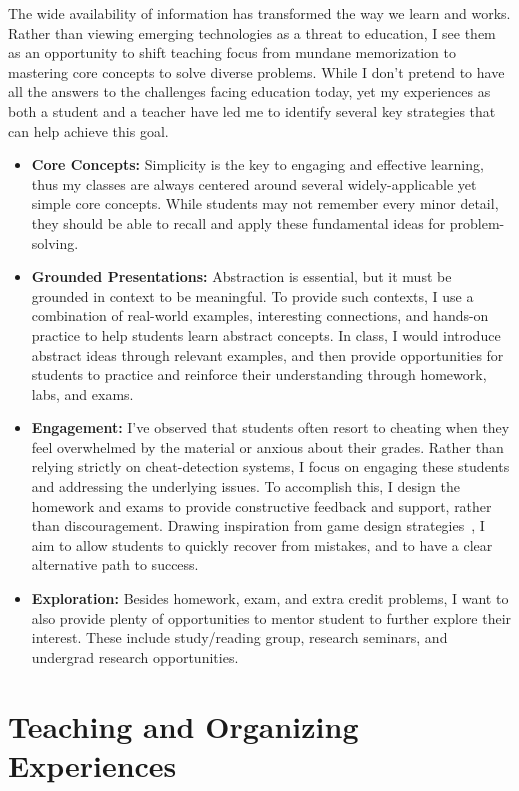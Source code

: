 \documentclass[11pt,a4paper,sans]{moderncv} %
\begin{document}
The wide availability of information has transformed the way we learn and works. 
Rather than viewing emerging technologies as a threat to education, I see them as an opportunity to shift teaching focus from mundane memorization to mastering core concepts to solve diverse problems.
While I don't pretend to have all the answers to the challenges facing education today, yet my experiences as both a student and a teacher have led me to identify several key strategies that can help achieve this goal.
\begin{itemize}
  \item \textbf{Core Concepts:}
  Simplicity is the key to engaging and effective learning, thus my classes are always centered around several widely-applicable yet simple core concepts. 
  While students may not remember every minor detail, they should be able to recall and apply these fundamental ideas for problem-solving.
  \item \textbf{Grounded Presentations:} 
  Abstraction is essential, but it must be grounded in context to be meaningful. 
  To provide such contexts, I use a combination of real-world examples, interesting connections, and hands-on practice to help students learn abstract concepts. 
  In class, I would introduce abstract ideas through relevant examples, and then provide opportunities for students to practice and reinforce their understanding through homework, labs, and exams.
  \item \textbf{Engagement:}
  I've observed that students often resort to cheating when they feel overwhelmed by the material or anxious about their grades. 
  Rather than relying strictly on cheat-detection systems, I focus on engaging these students and addressing the underlying issues. 
  To accomplish this, I design the homework and exams to provide constructive feedback and support, rather than discouragement. 
  Drawing inspiration from game design strategies~\cite{engelstein_AchievementRelockedLoss_2020,lewis_MotivationalGameDesign_2012}, I aim to allow students to quickly recover from mistakes, and to have a clear alternative path to success.
  \item \textbf{Exploration:} Besides homework, exam, and extra credit problems, I want to also provide plenty of opportunities to mentor student to further explore their interest. 
  These include study/reading group, research seminars, and undergrad research opportunities.
\end{itemize}

\section{Teaching and Organizing Experiences}
\end{document}
